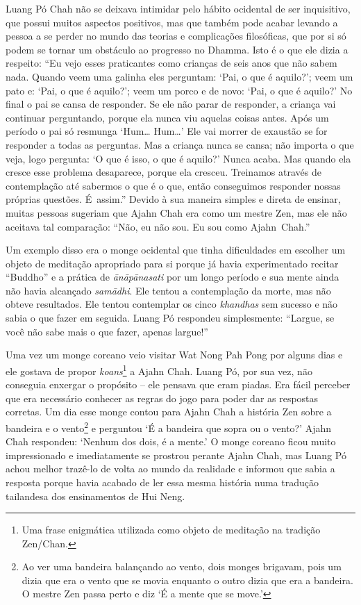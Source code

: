 Luang Pó Chah não se deixava intimidar pelo hábito ocidental de ser
inquisitivo, que possui muitos aspectos positivos, mas que também pode
acabar levando a pessoa a se perder no mundo das teorias e complicações
filosóficas, que por si só podem se tornar um obstáculo ao progresso no
Dhamma. Isto é o que ele dizia a respeito: ``Eu vejo esses praticantes
como crianças de seis anos que não sabem nada. Quando veem uma galinha
eles perguntam: `Pai, o que é aquilo?'; veem um pato e: `Pai, o que é
aquilo?'; veem um porco e de novo: `Pai, o que é aquilo?' No final o pai
se cansa de responder. Se ele não parar de responder, a criança vai
continuar perguntando, porque ela nunca viu aquelas coisas antes. Após
um período o pai só resmunga `Hum\ldots{} Hum\ldots{}' Ele vai morrer de
exaustão se for responder a todas as perguntas. Mas a criança nunca se
cansa; não importa o que veja, logo pergunta: `O que é isso, o que é
aquilo?' Nunca acaba. Mas quando ela cresce esse problema desaparece,
porque ela cresceu. Treinamos através de contemplação até sabermos o que
é o que, então conseguimos responder nossas próprias questões.
É~assim.'' Devido à sua maneira simples e direta de ensinar, muitas
pessoas sugeriam que Ajahn Chah era como um mestre Zen, mas ele não
aceitava tal comparação: ``Não, eu não sou. Eu sou como Ajahn~Chah.''

Um exemplo disso era o monge ocidental que tinha dificuldades em
escolher um objeto de meditação apropriado para si porque já havia
experimentado recitar ``Buddho'' e a prática de \emph{ānāpānasati} por
um longo período e sua mente ainda não havia alcançado \emph{samādhi}.
Ele tentou a contemplação da morte, mas não obteve resultados. Ele
tentou contemplar os cinco \emph{khandhas} sem sucesso e não sabia o que
fazer em seguida. Luang Pó respondeu simplesmente: ``Largue, se você não
sabe mais o que fazer, apenas largue!''

Uma vez um monge coreano veio visitar Wat Nong Pah Pong por alguns dias
e ele gostava de propor \emph{koans}\footnote{Uma frase enigmática
  utilizada como objeto de meditação na tradição Zen/Chan.} a Ajahn
Chah. Luang Pó, por sua vez, não conseguia enxergar o propósito -- ele
pensava que eram piadas. Era fácil perceber que era necessário conhecer
as regras do jogo para poder dar as respostas corretas. Um dia esse
monge contou para Ajahn Chah a história Zen sobre a bandeira e o
vento\footnote{Ao ver uma bandeira balançando ao vento, dois monges
  brigavam, pois um dizia que era o vento que se movia enquanto o outro
  dizia que era a bandeira. O mestre Zen passa perto e diz `É a mente
  que se move.'} e perguntou `É a bandeira que sopra ou o vento?' Ajahn
Chah respondeu: `Nenhum dos dois, é a mente.' O monge coreano ficou
muito impressionado e imediatamente se prostrou perante Ajahn Chah, mas
Luang Pó achou melhor trazê-lo de volta ao mundo da realidade e informou
que sabia a resposta porque havia acabado de ler essa mesma história
numa tradução tailandesa dos ensinamentos de Hui Neng.

